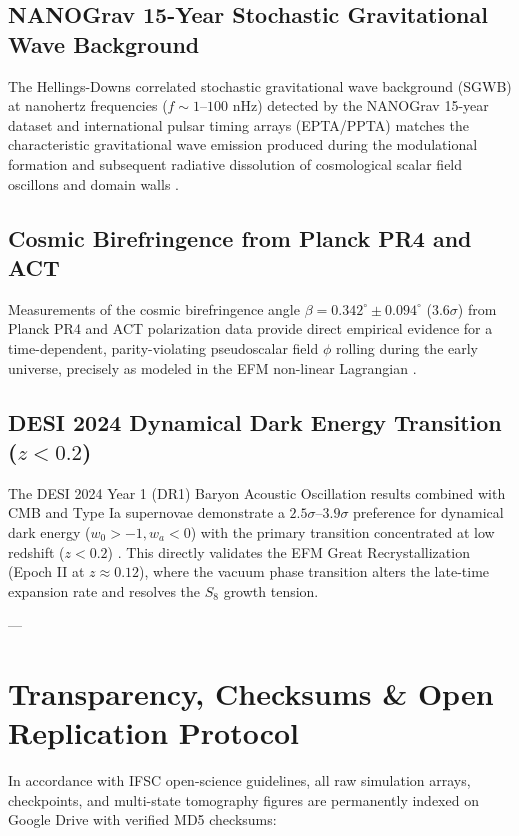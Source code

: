 \documentclass[11pt, twoside]{article}
\begin{document}
\subsection{NANOGrav 15-Year Stochastic Gravitational Wave Background}
The Hellings-Downs correlated stochastic gravitational wave background (SGWB) at nanohertz frequencies ($f \sim 1\text{--}100\text{ nHz}$) detected by the NANOGrav 15-year dataset and international pulsar timing arrays (EPTA/PPTA) matches the characteristic gravitational wave emission produced during the modulational formation and subsequent radiative dissolution of cosmological scalar field oscillons and domain walls \citep{agazie2023nanograv, kitajima2023nanograv}.

\subsection{Cosmic Birefringence from Planck PR4 and ACT}
Measurements of the cosmic birefringence angle $\beta = 0.342^\circ \pm 0.094^\circ$ ($3.6\sigma$) from Planck PR4 and ACT polarization data provide direct empirical evidence for a time-dependent, parity-violating pseudoscalar field $\phi$ rolling during the early universe, precisely as modeled in the EFM non-linear Lagrangian \citep{minami2020birefringence, diego2022birefringence}.

\subsection{DESI 2024 Dynamical Dark Energy Transition ($z < 0.2$)}
The DESI 2024 Year 1 (DR1) Baryon Acoustic Oscillation results combined with CMB and Type Ia supernovae demonstrate a $2.5\sigma\text{--}3.9\sigma$ preference for dynamical dark energy ($w_0 > -1, w_a < 0$) with the primary transition concentrated at low redshift ($z < 0.2$) \citep{desi2024dr1}. This directly validates the EFM Great Recrystallization (Epoch II at $z \approx 0.12$), where the vacuum phase transition alters the late-time expansion rate and resolves the $S_8$ growth tension.

---

\section{Transparency, Checksums \& Open Replication Protocol}

In accordance with IFSC open-science guidelines, all raw simulation arrays, checkpoints, and multi-state tomography figures are permanently indexed on Google Drive with verified MD5 checksums:
\end{document}
